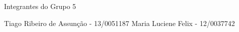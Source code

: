 \begin{folhadeaprovacao}

  \begin{center}
    {\ABNTEXchapterfont\large\imprimirautor}

    \vspace*{\fill}\vspace*{\fill}
    {\ABNTEXchapterfont\bfseries\Large\imprimirtitulo}
    \vspace*{\fill}

    Integrantes do Grupo 5

   \end{center}

   Tiago Ribeiro de Assunção - 13/0051187
   Maria Luciene Felix - 12/0037742

\end{folhadeaprovacao}
